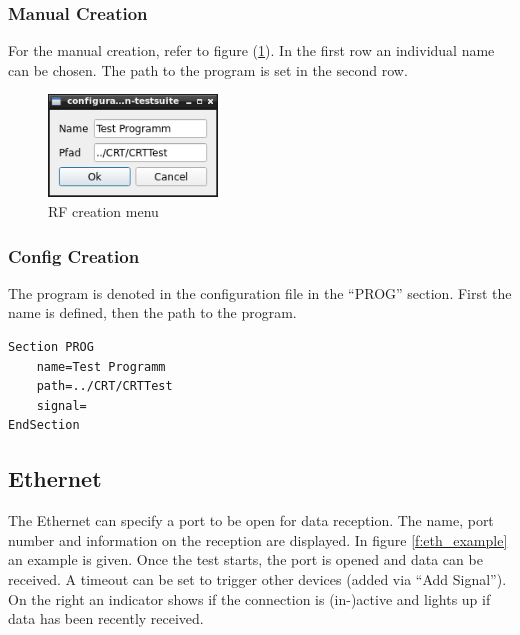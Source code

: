 \documentclass[10pt,a4paper]{article}
\begin{document}
		\subsubsection{Manual Creation}	
		For the manual creation, refer to figure (\ref{f:prog_menu}). In the first row an individual name can be chosen. The path to the program is set in the second row. 
		
		\begin{figure}[H]
\centering
\includegraphics[width=0.4\textwidth]{./7_PROG_menu.png}
\caption{RF creation menu}
\label{f:prog_menu}
		\end{figure}
			
		\subsubsection{Config Creation}
		The program is denoted in the configuration file in the \enquote{PROG} section. First the name is defined, then the path to the program.
	
\begin{lstlisting}[caption=PROG Config]
Section PROG
	name=Test Programm
	path=../CRT/CRTTest
	signal=
EndSection
\end{lstlisting}
	
	\newpage
	\subsection{Ethernet}
	The Ethernet can specify a port to be open for data reception. The name, port number and information on the reception are displayed. In figure \eqref{f:eth_example} an example is given. Once the test starts, the port is opened and data can be received. A timeout can be set to trigger other devices (added via \enquote{Add Signal}). On the right an indicator shows if the connection is (in-)active and lights up if data has been recently received. 
	
\end{document}
